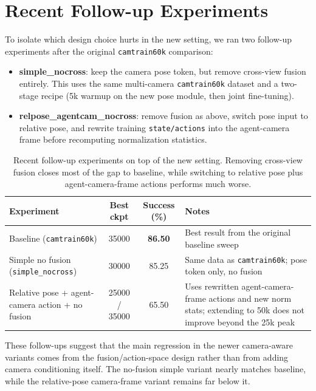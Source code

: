 \documentclass[11pt]{article}
\begin{document}
\section{Recent Follow-up Experiments}
To isolate which design choice hurts in the new setting, we ran two follow-up experiments after the original \texttt{camtrain60k} comparison:
\begin{itemize}
    \item \textbf{simple\_nocross}: keep the camera pose token, but remove cross-view fusion entirely. This uses the same multi-camera \texttt{camtrain60k} dataset and a two-stage recipe (5k warmup on the new pose module, then joint fine-tuning).
    \item \textbf{relpose\_agentcam\_nocross}: remove fusion as above, switch pose input to relative pose, and rewrite training \texttt{state/actions} into the agent-camera frame before recomputing normalization statistics.
\end{itemize}

\begin{table}[h]
\centering
\small
\begin{tabular}{>{\raggedright\arraybackslash}p{5.1cm}cc>{\raggedright\arraybackslash}p{4.0cm}}
\toprule
\textbf{Experiment} & \textbf{Best ckpt} & \textbf{Success (\%)} & \textbf{Notes} \\
\midrule
Baseline (\texttt{camtrain60k}) & 35000 & \textbf{86.50} & Best result from the original baseline sweep \\
Simple no fusion (\texttt{simple\_nocross}) & 30000 & 85.25 & Same data as \texttt{camtrain60k}; pose token only, no fusion \\
Relative pose + agent-camera action + no fusion & 25000 / 35000 & 65.50 & Uses rewritten agent-camera-frame actions and new norm stats; extending to 50k does not improve beyond the 25k peak \\
\bottomrule
\end{tabular}
\caption{Recent follow-up experiments on top of the new setting. Removing cross-view fusion closes most of the gap to baseline, while switching to relative pose plus agent-camera-frame actions performs much worse.}
\label{tab:cam_followup_summary}
\end{table}

These follow-ups suggest that the main regression in the newer camera-aware variants comes from the fusion/action-space design rather than from adding camera conditioning itself. The no-fusion simple variant nearly matches baseline, while the relative-pose camera-frame variant remains far below it.
\end{document}
